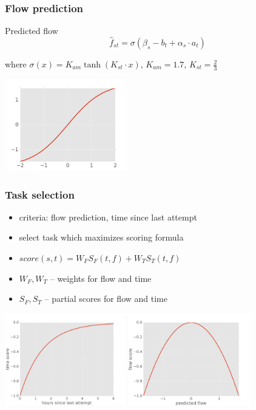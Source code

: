 \documentclass[xcolor=dvipsnames, 14pt]{beamer}
\begin{document}
\begin{frame}
\frametitle{Flow prediction}

\begin{block}{Predicted flow}
\[
  \hat{f}_{st} = \sigma ( \beta_s - b_t + \alpha_s \cdot a_t )
\]
\end{block}

where $\sigma (x) = K_{am} \tanh (K_{st} \cdot x)$,
$K_{am} = 1.7$, $K_{st} = \frac{2}{3}$

\centering\includegraphics[height=4cm]{img/tanh.png}
\end{frame}

\begin{frame}
\frametitle{Task selection}
\begin{itemize}
\item criteria: flow prediction, time since last attempt
\item select task which maximizes scoring formula
\item $score(s, t) = W_F S_F(t, f) + W_T S_T(t, f)$
\item $W_F, W_T$ -- weights for flow and time
\item $S_F, S_T$ -- partial scores for flow and time
\end{itemize}
\centering
\includegraphics[height=4cm]{img/score-time.pdf}
\includegraphics[height=4cm]{img/score-flow.pdf}
\end{frame}
\end{document}
